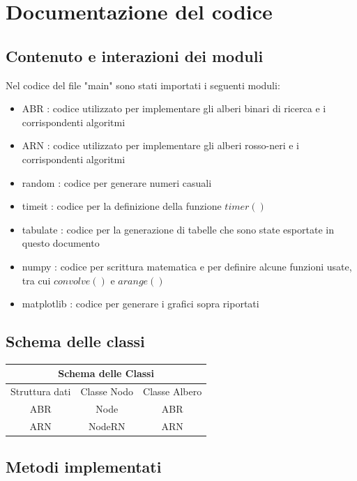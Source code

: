\documentclass{article}
\begin{document}
\section{Documentazione del codice}

\subsection{Contenuto e interazioni dei moduli}

Nel codice del file "main" sono stati importati i seguenti moduli:
\begin{itemize}
\item ABR : codice utilizzato per implementare gli alberi binari di ricerca e i corrispondenti algoritmi
\item ARN : codice utilizzato per implementare gli alberi rosso-neri e i corrispondenti algoritmi
\item random : codice per generare numeri casuali
\item timeit : codice per la definizione della funzione $timer()$
\item tabulate : codice per la generazione di tabelle che sono state esportate in questo documento
\item numpy : codice per scrittura matematica e per definire alcune funzioni usate, tra cui $convolve()$ e $arange()$
\item matplotlib : codice per generare i grafici sopra riportati
\end{itemize}

\subsection{Schema delle classi}

\begin{table}[h]
\centering
\begin{tabular}{|c|cc|}
\multicolumn{3}{c}{Schema delle Classi}\\
\hline
    Struttura dati &    Classe Nodo &   Classe Albero \\
\hline
               ABR &         Node   &             ABR \\
\hline
               ARN &         NodeRN &             ARN \\
\hline
\end{tabular}
\end{table}

\subsection{Metodi implementati}
\end{document}
